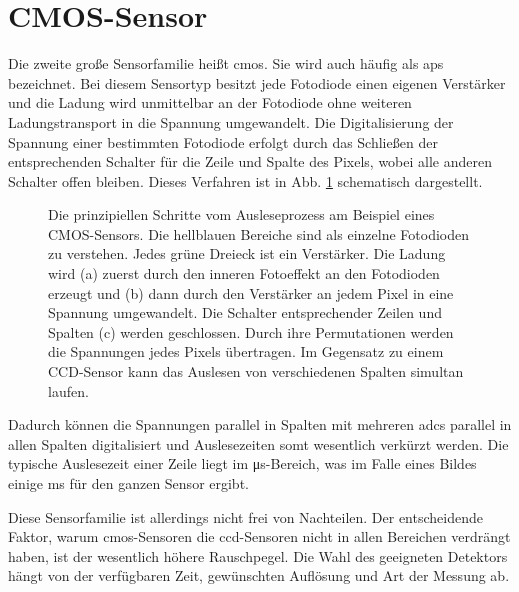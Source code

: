 \section{CMOS-Sensor}
\label{text:cmos_theorie}
Die zweite große Sensorfamilie heißt \gls{cmos}. Sie wird auch häufig als \gls{aps} bezeichnet. Bei diesem Sensortyp besitzt jede Fotodiode einen eigenen Verstärker und die Ladung wird unmittelbar an der Fotodiode ohne weiteren Ladungstransport in die Spannung umgewandelt. Die Digitalisierung der Spannung einer bestimmten Fotodiode erfolgt durch das Schließen der entsprechenden Schalter für die Zeile und Spalte des Pixels, wobei alle anderen Schalter offen bleiben. Dieses Verfahren ist in Abb. \ref{fig:cmos_scheme} schematisch dargestellt.
\begin{figure}[H]
    
    \caption{Die prinzipiellen Schritte vom Ausleseprozess am Beispiel eines  CMOS-Sensors. Die hellblauen Bereiche sind als einzelne Fotodioden zu verstehen. Jedes grüne Dreieck ist ein Verstärker. Die Ladung wird (a) zuerst durch den inneren Fotoeffekt an den Fotodioden erzeugt und (b) dann durch den Verstärker an jedem Pixel in eine Spannung umgewandelt. Die Schalter entsprechender Zeilen und Spalten (c) werden geschlossen. Durch ihre Permutationen werden die Spannungen jedes Pixels übertragen. Im Gegensatz zu einem CCD-Sensor kann das Auslesen von verschiedenen Spalten simultan laufen.}
    \label{fig:cmos_scheme}
\end{figure}
\noindent
Dadurch können die Spannungen parallel in Spalten mit mehreren \gls{adc}s parallel in allen Spalten digitalisiert und Auslesezeiten somt wesentlich verkürzt werden. Die typische Auslesezeit einer Zeile liegt im \si{\micro\second}-Bereich, was im Falle eines  Bildes einige \si{\milli\second} für den ganzen Sensor ergibt.

\noindent
Diese Sensorfamilie ist allerdings nicht frei von Nachteilen. Der entscheidende Faktor, warum \gls{cmos}-Sensoren die \gls{ccd}-Sensoren nicht in allen Bereichen verdrängt haben, ist der wesentlich höhere Rauschpegel. Die Wahl des geeigneten Detektors hängt von der verfügbaren Zeit, gewünschten Auflösung und Art der Messung ab.

